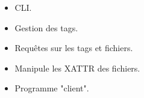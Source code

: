 \documentclass[10pt]{beamer}
\begin{document}
\begin{frame}
\begin{columns}[T]
\begin{column}{.5\textwidth}
        \end{column}
        \pause
        \begin{column}{.5\textwidth}
            \begin{itemize}
                \item CLI.
                \item Gestion des tags.
                \item Requêtes sur les tags et fichiers.
                \item Manipule les XATTR des fichiers.
                \item Programme "client".
            \end{itemize}
        \end{column}
    \end{columns}
\end{frame}
\end{document}
